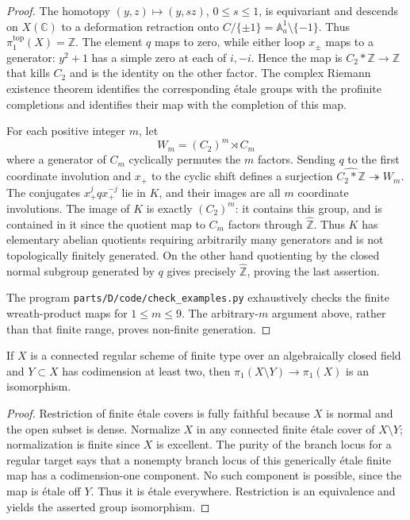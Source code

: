 \begin{proof}
The homotopy $(y,z)\mapsto(y,sz)$, $0\leq s\leq1$, is equivariant
and descends on $X(\mathbb C)$ to a deformation retraction onto
$C/\{\pm1\}=\mathbb A^1_a\setminus\{-1\}$. Thus
$\pi_1^{\mathrm{top}}(X)=\mathbb Z$. The element $q$ maps to zero,
while either loop $x_\pm$ maps to a generator: $y^2+1$ has a simple
zero at each of $i,-i$. Hence the map is
$C_2*\mathbb Z\to\mathbb Z$ that kills $C_2$ and is the identity on
the other factor. The complex Riemann existence theorem \cite[XII, Theorem 5.1, p. 333]{SGA1} identifies the
corresponding \'etale groups with the profinite completions and identifies
their map with the completion of this map.

For each positive integer $m$, let
\[
 W_m=(C_2)^m\rtimes C_m
\]
where a generator of $C_m$ cyclically permutes the $m$ factors. Sending
$q$ to the first coordinate involution and $x_+$ to the cyclic shift
defines a surjection $\widehat{C_2*\mathbb Z}\twoheadrightarrow W_m$.
The conjugates $x_+^j qx_+^{-j}$ lie in $K$, and their images are all
$m$ coordinate involutions. The image of $K$ is exactly $(C_2)^m$:
it contains this group, and is contained in it since the quotient map
to $C_m$ factors through $\widehat{\mathbb Z}$. Thus $K$ has elementary
abelian quotients requiring arbitrarily many generators and is not
topologically finitely generated. On the other hand quotienting by the
closed normal subgroup generated by $q$ gives precisely
$\widehat{\mathbb Z}$, proving the last assertion.

The program \texttt{parts/D/code/check\_examples.py} exhaustively checks
the finite wreath-product maps for $1\leq m\leq9$. The arbitrary-$m$
argument above, rather than that finite range, proves non-finite generation.
\end{proof}

\begin{proposition}
\label{D:kernel-regular}
If $X$ is a connected regular scheme of finite type over an algebraically
closed field and $Y\subset X$ has codimension at least two, then
$\pi_1(X\setminus Y)\to\pi_1(X)$ is an isomorphism.
\end{proposition}
\begin{proof}
Restriction of finite \'etale covers is fully faithful because $X$ is
normal and the open subset is dense. Normalize $X$ in any connected
finite \'etale cover of $X\setminus Y$; normalization is finite since
$X$ is excellent. The purity of the branch locus for a regular target
\cite[X, Theorem 3.3, pp. 276--277]{SGA1} says that a nonempty branch locus of this generically \'etale finite
map has a codimension-one component. No such component is possible,
since the map is \'etale off $Y$. Thus it is \'etale everywhere.
Restriction is an equivalence and yields the asserted group isomorphism.
\end{proof}



